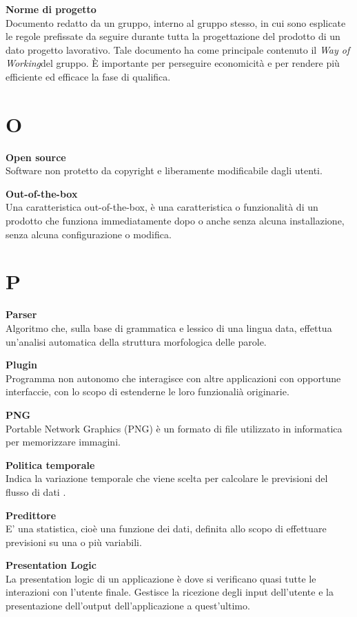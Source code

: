 \documentclass[a4paper, oneside, openany, dvipsnames, table, 12pt]{article}
\begin{document}
\textbf{Norme di progetto} \\
Documento redatto da un gruppo, interno al gruppo stesso, in cui sono esplicate le regole prefissate da seguire durante tutta la progettazione del prodotto di un dato progetto lavorativo. Tale documento ha come principale contenuto il \textit{Way of Working}\glo del gruppo. È importante per perseguire economicità e per rendere più efficiente ed efficace la fase di qualifica.

\newpage
\section{O}
\label{par:opens}
\textbf{Open source} \\
Software non protetto da copyright e liberamente modificabile dagli utenti.

\textbf{Out-of-the-box} \\
Una caratteristica out-of-the-box, è una caratteristica o funzionalità di un prodotto che funziona immediatamente dopo o anche senza alcuna installazione, senza alcuna configurazione o modifica.

\newpage
\section{P}
\textbf{Parser} \\
Algoritmo che, sulla base di grammatica e lessico di una lingua data, effettua un’analisi automatica della struttura morfologica delle parole.

\textbf{Plugin} \\
Programma non autonomo che interagisce con altre applicazioni con opportune interfaccie, con lo scopo di estenderne le loro funzionalià originarie.

\textbf{PNG} \\
Portable Network Graphics (PNG) è un formato di file utilizzato in informatica per memorizzare immagini.

\textbf{Politica temporale} \\
Indica la variazione temporale che viene scelta per calcolare le previsioni del flusso di dati .

\textbf{Predittore} \\
E' una statistica, cioè una funzione dei dati, definita allo scopo di effettuare previsioni su una o più variabili.

\textbf{Presentation Logic} \\
La presentation logic di un applicazione è dove si verificano quasi tutte le interazioni con l'utente finale. Gestisce la ricezione degli input dell'utente e la presentazione dell'output dell'applicazione a quest'ultimo.
\end{document}
